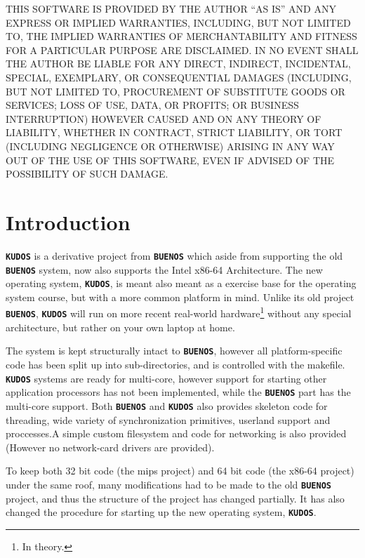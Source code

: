 \documentclass[twoside,a4paper]{report}
\newlength{\tablewidth}
\newcommand{\buenos}{\texttt{\textbf{BUENOS}}}
\newcommand{\kudos}{\texttt{\textbf{KUDOS}}}
\begin{document}
\begin{titlepage}
THIS SOFTWARE IS PROVIDED BY THE AUTHOR ``AS IS'' AND ANY EXPRESS
OR IMPLIED WARRANTIES, INCLUDING, BUT NOT LIMITED TO, THE IMPLIED
WARRANTIES OF MERCHANTABILITY AND FITNESS FOR A PARTICULAR PURPOSE
ARE DISCLAIMED. IN NO EVENT SHALL THE AUTHOR BE LIABLE FOR ANY
DIRECT, INDIRECT, INCIDENTAL, SPECIAL, EXEMPLARY, OR CONSEQUENTIAL
DAMAGES (INCLUDING, BUT NOT LIMITED TO, PROCUREMENT OF SUBSTITUTE
GOODS OR SERVICES; LOSS OF USE, DATA, OR PROFITS; OR BUSINESS
INTERRUPTION) HOWEVER CAUSED AND ON ANY THEORY OF LIABILITY,
WHETHER IN CONTRACT, STRICT LIABILITY, OR TORT (INCLUDING
NEGLIGENCE OR OTHERWISE) ARISING IN ANY WAY OUT OF THE USE OF THIS
SOFTWARE, EVEN IF ADVISED OF THE POSSIBILITY OF SUCH DAMAGE.

\end{titlepage}


\tableofcontents

\cleardoublepage
\pagestyle{normal}
\setlength{\tablewidth}{\linewidth-1cm}

\chapter{Introduction}

\kudos{} is a derivative project from \buenos{} which aside from supporting
the old \buenos{} system, now also supports the Intel x86-64 Architecture.
The new operating system, \kudos{}, is meant also meant as a exercise base
for the operating system course, but with a more common platform in mind.
Unlike its old project \buenos{}, \kudos{} will run on more recent real-world
hardware\footnote{In theory.} without any special architecture, but rather 
on your own laptop at home.

The system is kept structurally intact to \buenos{}, however all platform-specific
code has been split up into sub-directories, and is controlled with the makefile.
\kudos{} systems are ready for multi-core, however support for starting other
application processors has not been implemented, while the \buenos{} part
has the multi-core support. Both \buenos{} and \kudos{} also provides skeleton code 
for threading, wide variety of synchronization primitives, userland support and
proccesses.A simple custom filesystem and code for networking is also 
provided (However no network-card drivers are provided). 

To keep both 32 bit code (the mips project) and 64 bit code (the x86-64 project)
under the same roof, many modifications had to be made to the old \buenos{} 
project, and thus the structure of the project has changed partially. It has also
changed the procedure for starting up the new operating system, \kudos{}.
\end{document}
